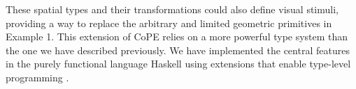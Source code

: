 These spatial types and their transformations could also define visual
stimuli, providing a way to replace the arbitrary and limited
geometric primitives in Example 1. This extension of CoPE relies on a
more powerful type system than the one we have described
previously. We have implemented the central features in the purely
functional language Haskell using extensions that enable type-level
programming \citep{Kiselyov2010}.


